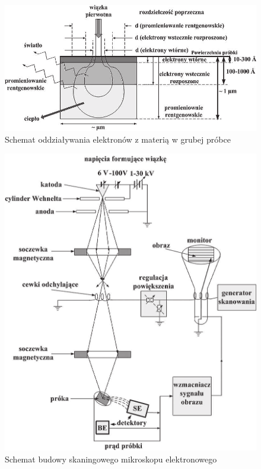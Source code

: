 \documentclass{article}
\begin{document}
\begin{enumerate}
\begin{itemize}
\begin{figure}[h!]
\centering
\includegraphics[scale=0.4]{gruszka.png}
\caption{Schemat oddziaływania elektronów z materią w grubej próbce}
\end{figure}


\begin{figure}[h!]
\centering
\includegraphics[scale=0.3]{sem.png}
\caption{Schemat budowy skaningowego mikroskopu elektronowego}
\end{figure}


\end{itemize}
\end{enumerate}
\end{document}
